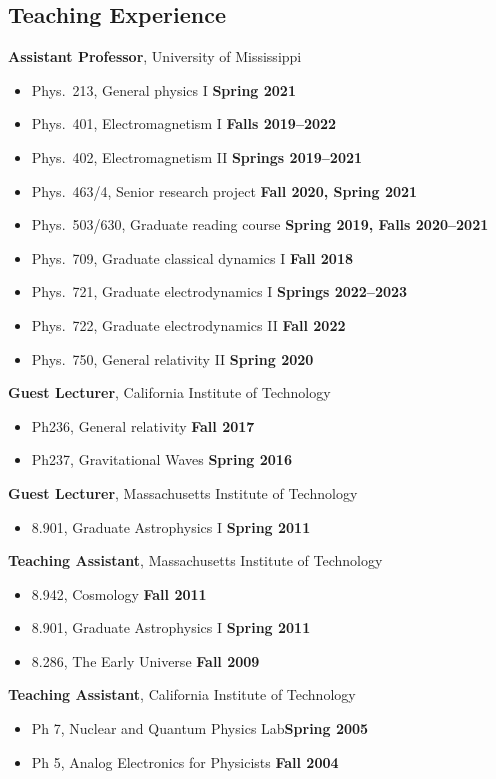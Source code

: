 \documentclass[margin,line]{res}
\begin{document}
\begin{resume}
\vspace{-1em}

\section{\sc Teaching Experience}
{\bf Assistant Professor}, University of Mississippi
\vspace*{.05in}
\begin{itemize}
\item[ ] Phys.~213, General physics I \hfill {\bf Spring 2021}
\item[ ] Phys.~401, Electromagnetism I \hfill {\bf Falls 2019--2022}
\item[ ] Phys.~402, Electromagnetism II \hfill {\bf Springs 2019--2021}
\item[ ] Phys.~463/4, Senior research project \hfill {\bf Fall 2020,
    Spring 2021}
\item[ ] Phys.~503/630, Graduate reading course \hfill {\bf Spring 2019, Falls 2020--2021}
\item[ ] Phys.~709, Graduate classical dynamics I \hfill {\bf Fall 2018}
\item[ ] Phys.~721, Graduate electrodynamics I \hfill {\bf Springs 2022--2023}
\item[ ] Phys.~722, Graduate electrodynamics II \hfill {\bf Fall 2022}
\item[ ] Phys.~750, General relativity II \hfill {\bf Spring 2020}
\end{itemize}
{\bf Guest Lecturer}, California Institute of Technology
\vspace*{.05in}
\begin{itemize}
\item[ ] Ph236, General relativity \hfill {\bf Fall 2017}
\item[ ] Ph237, Gravitational Waves \hfill {\bf Spring 2016}
\end{itemize}
{\bf Guest Lecturer}, Massachusetts Institute of Technology
\vspace*{.05in}  
\begin{itemize}
\item[ ] 8.901, Graduate Astrophysics I \hfill {\bf Spring 2011}
\end{itemize}
{\bf Teaching Assistant}, Massachusetts Institute of Technology
\vspace*{.05in}
\begin{itemize}
\item[ ] 8.942, Cosmology \hfill {\bf Fall 2011}
\item[ ] 8.901, Graduate Astrophysics I \hfill {\bf Spring 2011}
\item[ ] 8.286, The Early Universe \hfill {\bf Fall 2009}
\end{itemize}
{\bf Teaching Assistant}, California Institute of Technology
\vspace*{.05in}
\begin{itemize}
\item[ ] Ph 7, Nuclear and Quantum Physics Lab\hfill {\bf Spring 2005}
\item[ ] Ph 5, Analog Electronics for Physicists \hfill {\bf Fall 2004}
\end{itemize}


\end{resume}
\end{document}
